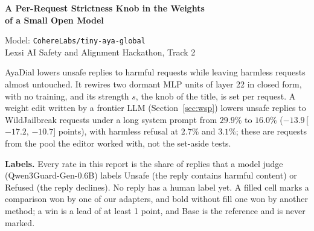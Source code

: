 \documentclass[10pt,a4paper]{article}
\begin{document}
\begin{center}
{\LARGE\bfseries A Per-Request Strictness Knob in the Weights\\[3pt] of a Small Open Model\par}
\vspace{8pt}
{\large Model: \texttt{CohereLabs/tiny-aya-global}}\\[3pt]
Lexsi AI Safety and Alignment Hackathon, Track 2
\end{center}
\vspace{4pt}
AyaDial lowers unsafe replies to harmful requests while leaving harmless requests almost untouched. It rewires two dormant MLP units of layer 22 in closed form, with no training, and its strength $s$, the knob of the title, is set per request. A weight edit written by a frontier LLM (Section~\ref{sec:wsp}) lowers unsafe replies to WildJailbreak requests under a long system prompt from $29.9$\% to $16.0$\% ($-13.9$\,[$-17.2$, $-10.7$] points), with harmless refusal at $2.7$\% and $3.1$\%; these are requests from the pool the editor worked with, not the set-aside tests.

\textbf{Labels.} Every rate in this report is the share of replies that a model judge (Qwen3Guard-Gen-0.6B) labels Unsafe (the reply contains harmful content) or Refused (the reply declines). No reply has a human label yet. A filled cell marks a comparison won by one of our adapters, and bold without fill one won by another method; a win is a lead of at least 1 point, and Base is the reference and is never marked.

\clearpage
\end{document}
